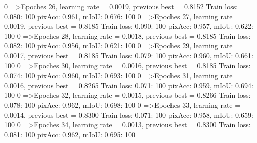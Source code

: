   0%
=>Epoches 26, learning rate = 0.0019,                 previous best = 0.8152
Train loss: 0.080: 100%
pixAcc: 0.961, mIoU: 0.676: 100%
  0%
=>Epoches 27, learning rate = 0.0019,                 previous best = 0.8185
Train loss: 0.090: 100%
pixAcc: 0.957, mIoU: 0.622: 100%
  0%
=>Epoches 28, learning rate = 0.0018,                 previous best = 0.8185
Train loss: 0.082: 100%
pixAcc: 0.956, mIoU: 0.621: 100%
  0%
=>Epoches 29, learning rate = 0.0017,                 previous best = 0.8185
Train loss: 0.079: 100%
pixAcc: 0.960, mIoU: 0.661: 100%
  0%
=>Epoches 30, learning rate = 0.0016,                 previous best = 0.8185
Train loss: 0.074: 100%
pixAcc: 0.960, mIoU: 0.693: 100%
  0%
=>Epoches 31, learning rate = 0.0016,                 previous best = 0.8265
Train loss: 0.071: 100%
pixAcc: 0.959, mIoU: 0.694: 100%
  0%
=>Epoches 32, learning rate = 0.0015,                 previous best = 0.8266
Train loss: 0.078: 100%
pixAcc: 0.962, mIoU: 0.698: 100%
  0%
=>Epoches 33, learning rate = 0.0014,                 previous best = 0.8300
Train loss: 0.071: 100%
pixAcc: 0.958, mIoU: 0.659: 100%
  0%
=>Epoches 34, learning rate = 0.0013,                 previous best = 0.8300
Train loss: 0.081: 100%
pixAcc: 0.962, mIoU: 0.695: 100%
